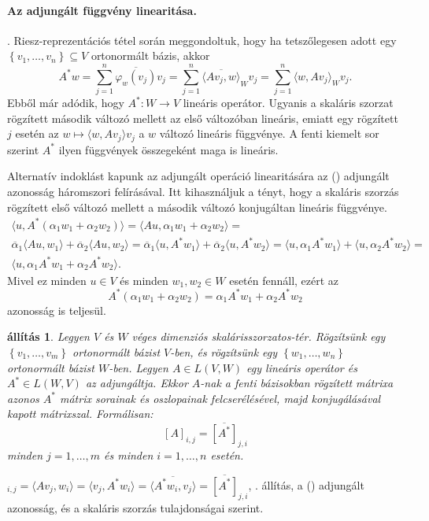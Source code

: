 \documentclass[a4paper, showtrims]{memoir}
\makeatletter
\renewenvironment{proof}[1][\proofname]
    {\par\pushQED{\qed}%
    \normalfont \topsep6\p@\@plus6\p@\relax
    \trivlist
    \item[\hskip\labelsep
        \itshape
    #1\@addpunct{:}]\ignorespaces}
    {\popQED\endtrivlist\@endpefalse}
\theoremstyle{plain}
\newtheorem{proposition}{állítás}[chapter]
\theoremstyle{remark}
\theoremstyle{definition}
\newcommand{\ip}[2]{\langle#1,#2\rangle}
\makeatother
\begin{document}
\paragraph{Az adjungált függvény linearitása.}
. Riesz-reprezentációs tétel során meggondoltuk,
hogy ha tetszőlegesen adott egy
$\left\{ v_1,\ldots,v_n \right\}\subseteq V$
ortonormált bázis, akkor
\[
	A^\ast w
	=
	\sum_{j=1}^n\overline{\varphi_w\left( v_j \right)}v_j
	=
	\sum_{j=1}^n\overline{\ip{Av_j}{w}}_Wv_j
	=
	\sum_{j=1}^n\ip{w}{Av_j}_Wv_j.
\]
Ebből már adódik, hogy $A^\ast:W\to V$ lineáris operátor.
Ugyanis a skaláris szorzat rögzített második változó mellett az első változóban lineáris,
emiatt egy rögzített $j$ esetén az $w\mapsto \ip{w}{Av_j}v_j$ a $w$ változó lineáris függvénye. A fenti kiemelt sor szerint $A^\ast$ ilyen függvények összegeként maga is lineáris.

Alternatív indoklást kapunk az adjungált operáció linearitására az (\dag) adjungált azonosság háromszori felírásával.
Itt kihasználjuk a tényt, hogy a skaláris szorzás rögzített első változó mellett a második változó konjugáltan lineáris függvénye.
\begin{multline*}
	\ip{u}{A^\ast\left( \alpha_1w_1+\alpha_2w_2 \right)}
	=
	\ip{Au}{\alpha_1w_1+\alpha_2w_2}
	=\\
	\overline{\alpha}_1\ip{Au}{w_1}+\overline{\alpha}_2\ip{Au}{w_2}
	=
	\overline{\alpha}_1\ip{u}{A^\ast w_1}+\overline{\alpha}_2\ip{u}{A^\ast w_2}
	=
	\ip{u}{\alpha_1 A^\ast w_1}+\ip{u}{\alpha_2 A^\ast w_2}
	=\\
	\ip{u}{\alpha_1 A^\ast w_1+\alpha_2 A^\ast w_2}.
\end{multline*}
Mivel ez minden $u\in V$ és minden $w_1,w_2\in W$ esetén fennáll,
ezért az
\begin{displaymath}
	A^\ast\left( \alpha_1w_1+\alpha_2w_2 \right)
	=
	\alpha_1A^\ast w_1+ \alpha_2A^\ast w_2
\end{displaymath}
azonosság is teljesül.

\begin{proposition}
	Legyen $V$ és $W$ véges dimenziós skalárisszorzatos-tér.
	Rögzítsünk egy $\left\{ v_1,\ldots,v_m \right\}$ ortonormált bázist $V$-ben,
	és rögzítsünk egy $\left\{w_1,\ldots,w_n\right\}$ ortonormált bázist $W$-ben.
	Legyen $A\in L\left( V,W \right)$ egy lineáris operátor és $A^\ast\in L\left( W,V \right)$ az adjungáltja.
	Ekkor $A$-nak a fenti bázisokban rögzített mátrixa azonos
	$A^\ast$ mátrix sorainak és oszlopainak felcserélésével, majd konjugálásával kapott mátrixszal.
	Formálisan:
	\[
		\left[ A \right]_{i,j}=\overline{\left[ A^\ast \right]}_{j,i}
	\]
	minden $j=1,\ldots,m$ és minden $i=1,\ldots,n$ esetén.
\end{proposition}
\begin{proof}
	\begin{math}
		[A]_{i,j}
		=
		\ip{Av_j}{w_i}
		=
		\ip{v_j}{A^\ast w_i}
		=
		\overline{
			\ip{A^\ast w_i}{v_j}
		}
		=
		\overline{
			[A^\ast]
		}_{j,i}
	\end{math},
    . állítás, a (\dag) adjungált azonosság, és a skaláris szorzás tulajdonságai szerint.
\end{proof}
\end{document}
